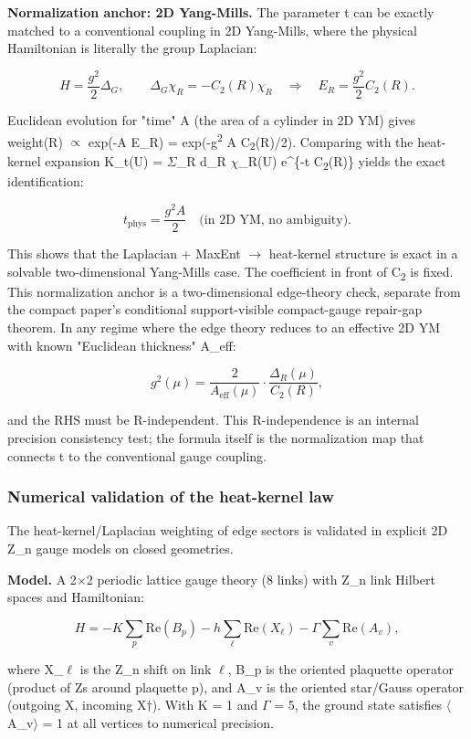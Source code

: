 \textbf{Normalization anchor: 2D Yang-Mills.} The parameter t can be exactly matched to a conventional coupling in 2D Yang-Mills, where the physical Hamiltonian is literally the group Laplacian:

\[
H = \frac{g^2}{2} \Delta_G, \qquad
\Delta_G \chi_R = -C_2(R) \chi_R
\quad \Rightarrow \quad
E_R = \frac{g^2}{2} C_2(R).
\]

Euclidean evolution for "time" A (the area of a cylinder in 2D YM) gives weight(R) \ensuremath{\propto} exp(-A E\_R) = exp(-g\textsuperscript{2} A C\textsubscript{2}(R)/2). Comparing with the heat-kernel expansion K\_t(U) = \ensuremath{\Sigma}\_R d\_R \ensuremath{\chi}\_R(U) e\^{}\{-t C\textsubscript{2}(R)\} yields the exact identification:

\[
t_\mathrm{phys} = \frac{g^2 A}{2} \quad \text{(in 2D YM, no ambiguity).}
\]

This shows that the Laplacian + MaxEnt \ensuremath{\to} heat-kernel structure is exact in a solvable two-dimensional Yang-Mills case. The coefficient in front of C\textsubscript{2} is fixed. This normalization anchor is a two-dimensional edge-theory check, separate from the compact paper's conditional support-visible compact-gauge repair-gap theorem. In any regime where the edge theory reduces to an effective 2D YM with known "Euclidean thickness" A\_eff:

\[
g^2(\mu) = \frac{2}{A_\mathrm{eff}(\mu)} \cdot \frac{\Delta_R(\mu)}{C_2(R)},
\]

and the RHS must be R-independent. This R-independence is an internal precision consistency test; the formula itself is the normalization map that connects t to the conventional gauge coupling.

\subsubsection{Numerical validation of the heat-kernel law}\label{614-numerical-validation-of-the-heat-kernel-law}

The heat-kernel/Laplacian weighting of edge sectors is validated in explicit 2D Z\_n gauge models on closed geometries.

\textbf{Model.} A 2\ensuremath{\times}2 periodic lattice gauge theory (8 links) with Z\_n link Hilbert spaces and Hamiltonian:

\[
H = -K \sum_p \mathrm{Re}(B_p) - h \sum_\ell \mathrm{Re}(X_\ell) - \Gamma \sum_v \mathrm{Re}(A_v),
\]

where X\_\ensuremath{\ell} is the Z\_n shift on link \ensuremath{\ell}, B\_p is the oriented plaquette operator (product of Z\textquotesingle s around plaquette p), and A\_v is the oriented star/Gauss operator (outgoing X, incoming X\ensuremath{\dagger}). With K = 1 and \ensuremath{\Gamma} = 5, the ground state satisfies \ensuremath{\langle}A\_v\ensuremath{\rangle} = 1 at all vertices to numerical precision.


